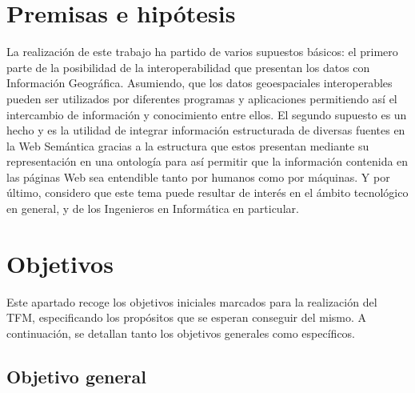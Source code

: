\section{Premisas e hipótesis}


La realización de este trabajo ha partido de varios supuestos básicos: el primero parte de la posibilidad de la interoperabilidad que presentan los datos con Información Geográfica. Asumiendo, que los datos geoespaciales interoperables pueden ser utilizados por diferentes programas y aplicaciones permitiendo así el intercambio de información y conocimiento entre ellos. El segundo supuesto es un hecho y es la utilidad de integrar información estructurada de diversas fuentes en la Web Semántica gracias a la estructura que estos presentan mediante su representación en una ontología para así permitir que la información contenida en las páginas Web sea entendible tanto por humanos como por máquinas. Y por último, considero que este tema puede resultar de interés en el ámbito tecnológico en general, y de los Ingenieros en Informática en particular.


\section{Objetivos}


Este apartado recoge los objetivos iniciales marcados para la realización del TFM, especificando los propósitos que se esperan conseguir del mismo. A continuación, se detallan tanto los objetivos generales como específicos.

\subsection{Objetivo general}

